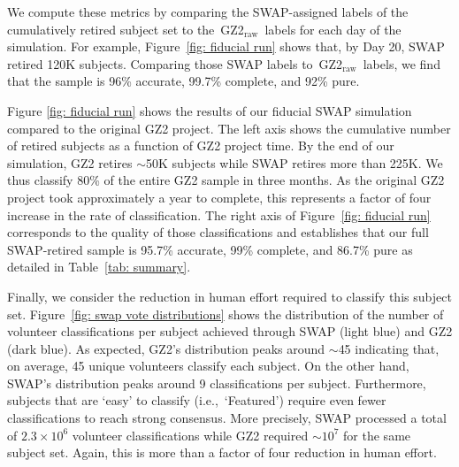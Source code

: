\documentclass[twocolumn]{aastex6}
\newcommand{\feat}{`Featured'}
\newcommand{\raw}{GZ2$_{\text{raw}}$}
\begin{document}
We compute these metrics by comparing the SWAP-assigned labels of
the cumulatively retired subject set  to the~\raw~labels for each day of
the simulation. 
For example, Figure~\ref{fig: fiducial run} shows that, by Day 20, 
SWAP retired 120K subjects. Comparing those SWAP labels to~\raw~labels, 
we find that the sample is 96\% accurate, 99.7\% complete, and 92\% pure. 

Figure \ref{fig: fiducial run} shows the results of our fiducial SWAP simulation
compared to the original GZ2 project. The left axis shows the cumulative
number of retired subjects as a function of GZ2 project time. 
By the end of our simulation, GZ2 retires $\sim$50K subjects while SWAP retires 
more than 225K. 
We thus classify 80\% of the entire GZ2 sample in three months. 
As the original GZ2 project took approximately a year to complete, this
represents a factor of four increase in the rate of classification.  
The right axis of Figure~\ref{fig: fiducial run} corresponds to the quality of 
those classifications and establishes that our full SWAP-retired sample
is 95.7\% accurate, 99\% complete, and 86.7\% pure as detailed in Table~\ref{tab: summary}.

Finally, we consider the reduction in human effort required to classify
this subject set. Figure~\ref{fig: swap vote distributions} shows the 
distribution of the number of volunteer classifications per subject 
achieved through SWAP (light blue) and GZ2 (dark blue). 
As expected, GZ2's distribution peaks around $\sim$45 indicating that, on average,
45 unique volunteers classify each subject. On the other hand, SWAP's
distribution peaks around 9 classifications per subject. 
Furthermore, subjects that are `easy' to classify (i.e.,~\feat) require
even fewer classifications to reach strong consensus. 
More precisely, SWAP processed a total of $2.3 \times 10^6$ volunteer 
classifications while GZ2 required $\sim$$10^7$ for the same subject set. 
Again, this is more than a factor of four reduction in human effort. 


\end{document}

